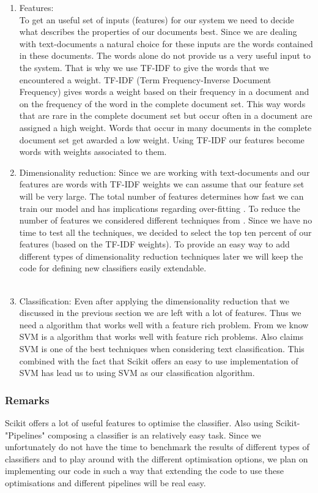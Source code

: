 \begin{enumerate}
\item Features:\\ 
To get an useful set of inputs (features) for our system we need to decide what describes the properties of our documents best. Since we are dealing with text-documents a natural choice for these inputs are the words contained in these documents. 
The words alone do not provide us a very useful input to the system. That is why we use TF-IDF to give the words that we encountered a weight. TF-IDF (Term Frequency-Inverse Document Frequency) gives words a weight based on their frequency in a document and on the frequency of the word in the complete document set. This way words that are rare in the complete document set but occur often in a document are assigned a high weight. Words that occur in many documents in the complete document set get awarded a low weight\cite{ramos_tfidf}.
Using TF-IDF our features become words with weights associated to them.

\item Dimensionality reduction: 
Since we are working with text-documents and our features are words with TF-IDF weights we can assume that our feature set will be very large. The total number of features determines how fast we can train our model and has implications regarding over-fitting \cite{ml_text}. To reduce the number of features we considered different techniques from \cite{ml_text}. Since we have no time to test all the techniques, we decided to select the top ten percent of our features (based on the TF-IDF weights)\cite{yang1997}. To provide an easy way to add different types of dimensionality reduction techniques later we will keep the code for defining new classifiers easily extendable.
\\
\\
\item Classification:
Even after applying the dimensionality reduction that we discussed in the previous section we are left with a lot of features. Thus we need a algorithm that works well with a feature rich problem. From \cite{MLCheatSheet} we know SVM is a algorithm that works well with feature rich problems. Also \cite{ml_text} claims SVM is one of the best techniques when considering text classification. This combined with the fact that Scikit offers an easy to use implementation of SVM has lead us to using SVM as our classification algorithm.
\end{enumerate}

\subsubsection{Remarks}
Scikit offers a lot of useful features to optimise the classifier. Also using Scikit-"Pipelines" composing a classifier is an relatively easy task. Since we unfortunately do not have the time to benchmark the results of different types of classifiers and to play around with the different optimisation options, we plan on implementing our code in such a way that extending the code to use these optimisations and different pipelines will be real easy.